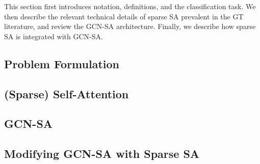 This section first introduces notation, 
definitions, and the classification task.
We then describe the relevant technical details
of sparse SA prevalent in the GT literature,
and review the \textsc{GCN-SA} architecture.
Finally, we describe how sparse SA 
is integrated with \textsc{GCN-SA}.

\subsection{Problem Formulation}


\subsection{(Sparse) Self-Attention}


\subsection{GCN-SA}


\subsection{Modifying GCN-SA with Sparse SA}

